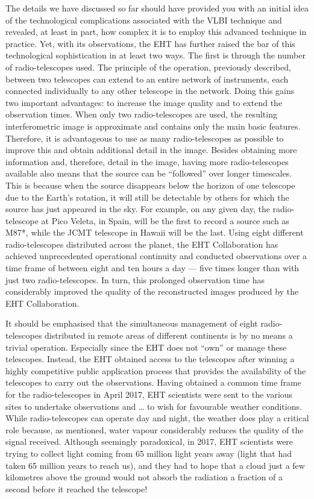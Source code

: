 The details we have discussed so far should have provided you with an initial idea of
the technological complications associated with the VLBI technique and revealed, at
least in part, how complex it is to employ this advanced technique in practice. Yet,
with its observations, the EHT has further raised the bar of this technological
sophistication in at least two ways. The first is through the number of radio-telescopes
used. The principle of the operation, previously described, between two telescopes can
extend to an entire network of instruments, each connected individually to any other
telescope in the network. Doing this gains two important advantages: to increase the
image quality and to extend the observation times. When only two radio-telescopes are
used, the resulting interferometric image is approximate and contains only the main
basic features. Therefore, it is advantageous to use as many radio-telescopes as
possible to improve this and obtain additional detail in the image. Besides obtaining
more information and, therefore, detail in the image, having more radio-telescopes
available also means that the source can be ``followed'' over longer timescales. This is
because when the source disappears below the horizon of one telescope due to the Earth's
rotation, it will still be detectable by others for which the source has just appeared
in the sky. For example, on any given day, the radio-telescope at Pico Veleta, in Spain,
will be the first to record a source such as M87*, while the JCMT
telescope in Hawaii will be the last. Using eight different
radio-telescopes distributed across the planet, the EHT Collaboration has achieved
unprecedented operational continuity and conducted observations over a time frame of
between eight and ten hours a day --- five times longer than with just two
radio-telescopes. In turn, this prolonged observation time has considerably improved the
quality of the reconstructed images produced by the EHT Collaboration.

It should be emphasised that the simultaneous management of eight radio-telescopes
distributed in remote areas of different continents is by no means a trivial operation.
Especially since the EHT does not ``own'' or manage these telescopes. Instead, the EHT
obtained access to the telescopes after winning a highly competitive public application
process that provides the availability of the telescopes to carry out the observations.
Having obtained a common time frame for the radio-telescopes in April 2017, EHT
scientists were sent to the various sites to undertake observations and \ldots{} to wish
for favourable weather conditions. While radio-telescopes can operate day and night, the
weather does play a critical role because, as mentioned, water vapour
considerably reduces the quality of the signal received. Although seemingly paradoxical,
in 2017, EHT scientists were trying to collect light coming from 65 million light years
away (light that had taken 65 million years to reach us), and they had to hope that a
cloud just a few kilometres above the ground would not absorb the radiation a fraction
of a second before it reached the telescope!

